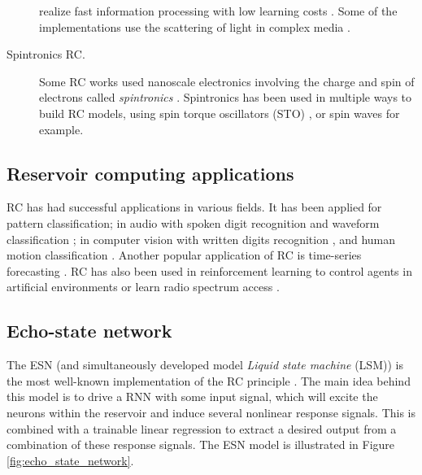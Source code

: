 \begin{description}
        realize fast information processing with low
        learning costs \parencite{paquotOptoelectronicReservoirComputing2012,
        martinenghiPhotonicNonlinearTransient2012,
        suganoReservoirComputingUsing2020, antonikHumanActionRecognition2019}.
        Some of the implementations use the scattering of light in complex media
        \parencite{dongOpticalReservoirComputing2020,
        rafayelyanLargeScaleOpticalReservoir2020}.
  \item[Spintronics \ac{RC}.] Some \ac{RC} works used nanoscale electronics
        involving the charge and spin of electrons called \emph{spintronics}
        \parencite{wolfSpintronicsSpinBasedElectronics2001}. Spintronics has
        been used in multiple ways to build \ac{RC} models, using spin torque
        oscillators (STO)
        \parencite{torrejonNeuromorphicComputingNanoscale2017,
        williameChaoticDynamicsMacrospin2019}, or spin waves
        \parencite{nakaneReservoirComputingSpin2018} for example.
\end{description}

\subsection{Reservoir computing applications}

\ac{RC} has had successful applications in various fields. It has been applied
for pattern classification; in audio with spoken digit recognition
\parencite{verstraetenIsolatedWordRecognition2005} and waveform classification
\parencite{paquotOptoelectronicReservoirComputing2012}; in computer vision with
written digits recognition \parencite{jalalvandRealTimeReservoirComputing2015},
and human motion classification \parencite{sohIterativeTemporalLearning2012,
  antonikHumanActionRecognition2019}. Another popular application of \ac{RC} is
time-series forecasting \parencite{jaegerEchoStateApproach2001,
  jaegerAdaptiveNonlinearSystem2002, wyffelsComparativeStudyReservoir2010}.
\ac{RC} has also been used in reinforcement learning to control agents in
artificial environments \parencite{kannoPhotonicReinforcementLearning2022} or
learn radio spectrum access \parencite{changDistributiveDynamicSpectrum2019}.

\subsection{Echo-state network}

The \acf{ESN} (and simultaneously developed model \emph{Liquid state machine}
(LSM)) is the most well-known implementation of the \ac{RC} principle
\parencite{tanakaRecentAdvancesPhysical2019}. The main idea behind this model is
to drive a \ac{RNN} with some input signal, which will excite the neurons within
the reservoir and induce several nonlinear response signals. This is combined
with a trainable linear regression to extract a desired output from a
combination of these response signals. The \ac{ESN} model is illustrated in 
Figure \ref{fig:echo_state_network}.

